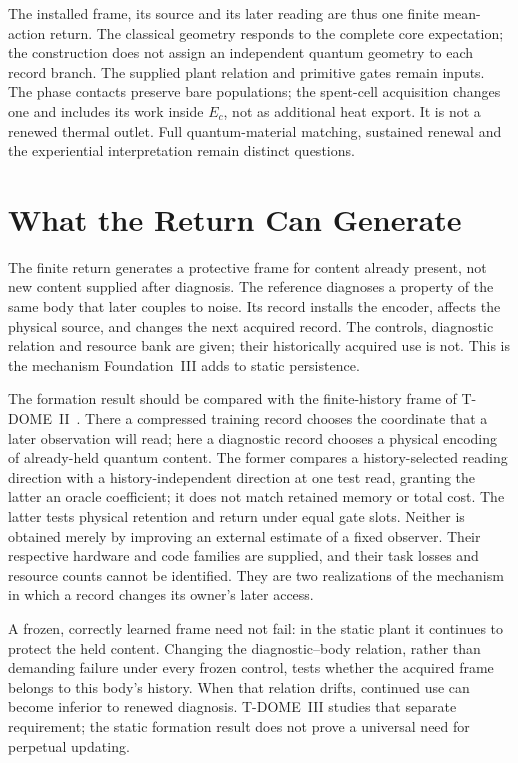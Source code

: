 \documentclass[12pt]{article}
\theoremstyle{definition}
\theoremstyle{remark}
\begin{document}
The installed frame, its source and its later reading are thus one
finite mean-action return. The classical geometry responds to the
complete core expectation; the construction does not assign an
independent quantum geometry to each record branch.
The supplied plant relation and primitive
gates remain inputs. The phase contacts preserve bare populations;
the spent-cell acquisition changes one and includes its work inside
$E_c$, not as additional heat export. It is not a renewed thermal
outlet. Full quantum-material matching, sustained renewal and the
experiential interpretation remain distinct questions.

\section{What the Return Can Generate}\label{sec:open}

The finite return generates a protective frame for content already
present, not new content supplied after diagnosis. The reference
diagnoses a property of the same body that later couples to noise.
Its record installs the encoder, affects the physical source, and
changes the next acquired record. The controls, diagnostic relation
and resource bank are given; their historically acquired use is not.
This is the mechanism Foundation~III adds to static persistence.

The formation result should be compared with the finite-history frame
of T-DOME~II~\cite{TDOMEII}. There a compressed training record chooses
the coordinate that a later observation will read; here a diagnostic
record chooses a physical encoding of already-held quantum content.
The former compares a history-selected reading direction with a
history-independent direction at one test read, granting the latter an
oracle coefficient; it does not match retained memory or total cost.
The latter tests physical retention and return under equal gate slots.
Neither is obtained merely by improving an external estimate of a
fixed observer. Their respective hardware and code families are
supplied, and their task losses and resource counts cannot be identified.
They are two realizations of the mechanism in which a record changes
its owner's later access.

A frozen, correctly learned frame need not fail: in the static plant it
continues to protect the held content. Changing the diagnostic--body
relation, rather than demanding failure under every frozen control,
tests whether the acquired frame belongs to this body's history.
When that relation drifts, continued use can become inferior to renewed
diagnosis. T-DOME~III studies that separate requirement; the static
formation result does not prove a universal need for perpetual updating.
\end{document}
